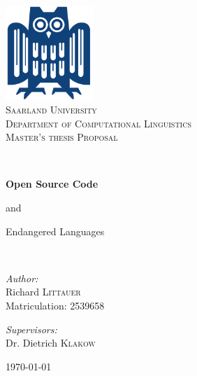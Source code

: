 \documentclass[12pt,a4paper]{article}
\author{Richard Littauer}
\begin{document}
\begin{titlepage}
	\begin{center}

		\includegraphics[width=0.25\textwidth]{eule.png}~\\[1cm]

		\textsc{\LARGE Saarland  University}\\[0.4cm]
		\textsc{\Large Department of Computational Linguistics}\\[1.5cm]

		\textsc{\LARGE Master's thesis Proposal}\vspace{0.5cm}

		\HRule \\[0.55cm]

		{ \huge \bfseries Open Source Code

			 and\vspace{0.2cm}

			 Endangered Languages}\vspace{0.5cm}

		\HRule \\[1.5cm]

		\begin{minipage}{0.45\textwidth}
			\begin{flushleft} \large
				\emph{Author:}\\
				Richard \textsc{Littauer}\\
				Matriculation: 2539658
			\end{flushleft}
		\end{minipage}
		\begin{minipage}{0.45\textwidth}
			\begin{flushright} \large
				\emph{Supervisors:} \\
				Dr. Dietrich \textsc{Klakow}\\
			\end{flushright}
		\end{minipage}

		\vfill

		{\large \today}

	\end{center}
\end{titlepage}
\newpage
\end{document}

